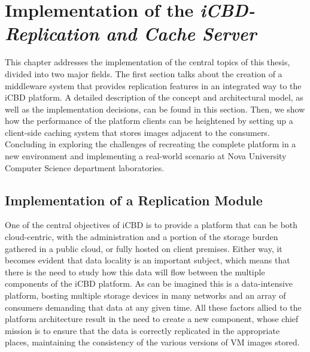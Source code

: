 \chapter{Implementation of the \textit{iCBD-Replication and Cache Server}}
\label{cha:impl_replication_caching}

This chapter addresses the implementation of the central topics of this thesis, divided into two major fields.
The first section talks about the creation of a middleware system that provides replication features in an integrated way to the iCBD platform. A detailed description of the concept and architectural model, as well as the implementation decisions, can be found in this section.
Then, we show how the performance of the platform clients can be heightened by setting up a client-side caching system that stores images adjacent to the consumers. Concluding in exploring the challenges of recreating the complete platform in a new environment and implementing a real-world scenario at Nova University Computer Science department laboratories.


\section{Implementation of a Replication Module}
\label{sec:replication_impl}

One of the central objectives of iCBD is to provide a platform that can be both cloud-centric, with the administration and a portion of the storage burden gathered in a public cloud, or fully hosted on client premises. Either way, it becomes evident that data locality is an important subject, which means that there is the need to study how this data will flow between the multiple components of the iCBD platform.
As can be imagined this is a data-intensive platform, bosting multiple storage devices in many networks and an array of consumers demanding that data at any given time.
All these factors allied to the platform architecture result in the need to create a new component, whose chief mission is to ensure that the data is correctly replicated in the appropriate places, maintaining the consistency of the various versions of VM images stored.

